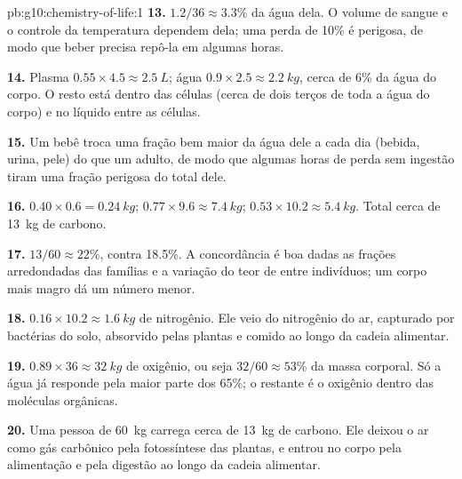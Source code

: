 \begin{solution}{pb:g10:chemistry-of-life:1}
\textbf{13.} $1.2/36 \approx 3.3\%$ da água dela. O volume de sangue e
o controle da temperatura dependem dela; uma perda de 10\% é perigosa,
de modo que beber precisa repô-la em algumas horas.

\textbf{14.} Plasma $0.55 \times 4.5 \approx \qty{2.5}{L}$; água $0.9
\times 2.5 \approx \qty{2.2}{kg}$, cerca de 6\% da água do corpo. O
resto está dentro das células (cerca de dois terços de toda a água do
corpo) e no líquido entre as células.

\textbf{15.} Um bebê troca uma fração bem maior da água dele a cada dia
(bebida, urina, pele) do que um adulto, de modo que algumas horas de
perda sem ingestão tiram uma fração perigosa do total dele.

\textbf{16.}  $0.40 \times 0.6 = \qty{0.24}{kg}$; 
$0.77 \times 9.6 \approx \qty{7.4}{kg}$;  $0.53 \times 10.2
\approx \qty{5.4}{kg}$. Total cerca de \qty{13}{kg} de carbono.

\textbf{17.} $13/60 \approx 22\%$, contra 18.5\%. A concordância é boa
dadas as frações arredondadas das famílias e a variação do teor de
 entre indivíduos; um corpo mais magro dá um número menor.

\textbf{18.} $0.16 \times 10.2 \approx \qty{1.6}{kg}$ de nitrogênio.
Ele veio do nitrogênio do ar, capturado por bactérias do solo, absorvido
pelas plantas e comido ao longo da cadeia alimentar.

\textbf{19.} $0.89 \times 36 \approx \qty{32}{kg}$ de oxigênio, ou seja
$32/60 \approx 53\%$ da massa corporal. Só a água já responde pela
maior parte dos 65\%; o restante é o oxigênio dentro das moléculas orgânicas.

\textbf{20.} Uma pessoa de \qty{60}{kg} carrega cerca de \qty{13}{kg} de
carbono. Ele deixou o ar como gás carbônico pela fotossíntese das
plantas, e entrou no corpo pela alimentação e pela digestão ao longo da
cadeia alimentar.
\end{solution}
